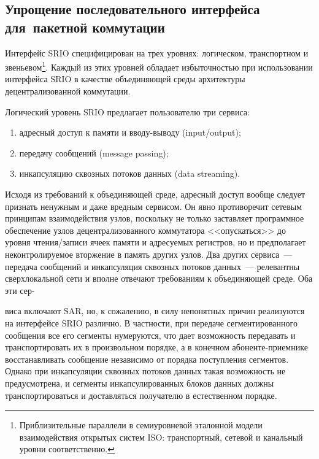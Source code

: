 \begin{multicols}{2}
\section{Упрощение последовательного интерфейса для~пакетной 
коммутации}

\vspace*{-4pt}
     
     Интерфейс SRIO специфицирован на трех уровнях: логическом, транспортном и 
звеньевом\footnote{Приблизительные параллели в семиуровневой эталонной модели 
взаимодействия открытых систем ISO: транспортный, сетевой и канальный уровни 
соответственно.}. Каж\-дый из этих уровней обладает избыточностью при использовании 
интерфейса SRIO в качестве объединяющей среды архитектуры децентрализованной 
коммутации.
     
     Логический уровень SRIO предлагает пользователю три сервиса:\\[-14pt]
     \begin{enumerate}[(1)]
     \item адресный доступ к памяти и вводу-выводу (input/output);\\[-14pt]
     \item  передачу сообщений (message passing);\\[-14pt]
\item  инкапсуляцию сквозных потоков данных (data streaming).
\end{enumerate}

     Исходя из требований к объединяющей среде, адресный доступ вообще следует 
признать ненужным и даже вредным сервисом. Он явно противоречит сетевым принципам 
взаимодействия узлов, поскольку не только заставляет программное обеспечение узлов 
децентрализованного коммутатора <<опускаться>> до уровня чтения/записи ячеек памяти и 
адресуемых регистров, но и предполагает неконтролируемое вторжение в память других 
узлов. Два других сервиса~--- передача сообщений и инкапсуляция сквозных потоков 
данных~--- релевантны сверхлокальной сети и вполне отвечают требованиям к 
объединяющей среде. Оба эти сер-\linebreak\vspace*{-12pt}
\columnbreak 


\noindent
виса включают SAR, но, к сожалению, в силу непонятных 
причин реализуются на интерфейсе SRIO различно. В частности, при передаче 
сегментированного сообщения все его сегменты нумеруются, что дает возможность 
передавать и транспортировать их в произвольном порядке, а в конечном 
     абоненте-приемнике восстанавливать сообщение независимо от порядка поступления 
сегментов. Однако при инкапсуляции сквозных потоков данных такая возможность не 
предусмотрена, и сегменты инкапсулированных блоков данных должны транспортироваться 
и доставляться получателю в естественном порядке. 


\end{multicols}
